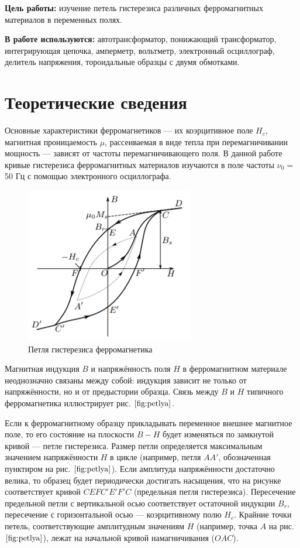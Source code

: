 \documentclass[a4paper,12pt]{article} %
\begin{document}
\textbf{Цель работы:} изучение петель гистерезиса различных ферромагнитных
материалов в переменных полях.

\textbf{В работе используются:} автотрансформатор, понижающий трансформатор, интегрирующая цепочка, амперметр, вольтметр, электронный
осциллограф, делитель напряжения, тороидальные образцы с двумя обмотками.


\section{Теоретические сведения}

Основные характеристики
ферромагнетиков — их коэрцитивное поле $H_c$, магнитная проницаемость
$\mu$, рассеиваемая в виде тепла при перемагничивании мощность — зависят
от частоты перемагничивающего поля. В данной работе кривые гистерезиса ферромагнитных материалов изучаются в поле частоты $\nu_0 =$ 50 Гц
с помощью электронного осциллографа.
\begin{figure}[H]
  \centering
  \includegraphics{petlya.png}
  \caption{Петля гистерезиса ферромагнетика}
  \label{fig:petlya}
\end{figure}

Магнитная индукция $ B $ и напряжённость поля $ H $ в ферромагнитном материале неоднозначно связаны между собой: индукция зависит
не только от напряжённости, но и от предыстории образца. Связь между $ B $ и $ H $ типичного ферромагнетика иллюстрирует рис. $\ref{fig:petlya}$.

Если к ферромагнитному образцу прикладывать переменное внешнее
магнитное поле, то его состояние на плоскости $ B-H $ будет изменяться
по замкнутой кривой — петле гистерезиса. Размер петли определяется
максимальным значением напряжённости $ H $ в цикле (например, петля $ AA' $,
обозначенная пунктиром на рис. $\ref{fig:petlya}$). Если амплитуда напряжённости достаточно велика, то образец будет периодически достигать насыщения,
что на рисунке соответствует кривой $ CEFC'E'F'C $ (предельная петля
гистерезиса). Пересечение предельной петли с вертикальной осью соответствует остаточной индукции $B_r$, пересечение с горизонтальной осью
— коэрцитивному полю $H_c$. Крайние точки петель, соответствующие амплитудным значениям $ H $ (например, точка $ A $ на рис. $\ref{fig:petlya}$), лежат на начальной кривой намагничивания ($ OAC $).
\end{document}

